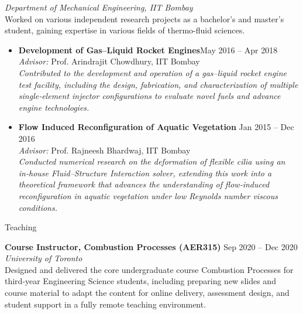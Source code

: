 \documentclass[11pt,a4paper]{article}
\begin{document}
	\emph{Department of Mechanical Engineering, IIT Bombay}\\
	Worked on various independent research projects as a bachelor's and master's student, gaining expertise in various fields of thermo-fluid sciences.\vspace*{6pt}
	\begin{itemize}[label=$\bullet$]
		\item {\bf Development of Gas–Liquid Rocket Engines}\hfill {May 2016 -- Apr 2018}\\
		{{\it Advisor:} Prof. Arindrajit Chowdhury, IIT Bombay}\\
		\emph{Contributed to the development and operation of a gas–liquid rocket engine test facility, including the design, fabrication, and characterization of multiple single‑element injector configurations to evaluate novel fuels and advance engine technologies.}\vspace*{6pt}
		\item {\bf Flow Induced Reconfiguration of Aquatic Vegetation
		}\hfill{Jan 2015 -- Dec 2016}\\
		{{\it Advisor:} Prof. Rajneesh Bhardwaj, IIT Bombay}\\
		\emph{Conducted numerical research on the deformation of flexible cilia using an in‑house Fluid–Structure Interaction solver, extending this work into a theoretical framework that advances the understanding of flow‑induced reconfiguration in aquatic vegetation under low Reynolds number viscous conditions.}
	\end{itemize}
	
	
	\begin{sectionbanner}{Teaching}
	\end{sectionbanner}
	\noindent\textbf{Course Instructor, Combustion Processes (AER315)} \hfill Sep 2020 -- Dec 2020 \\
	\emph{University of Toronto} \\
	Designed and delivered the core undergraduate course Combustion Processes for third-year Engineering Science students, including preparing new slides and course material to adapt the content for online delivery, assessment design, and student support in a fully remote teaching environment.
	
\end{document}
